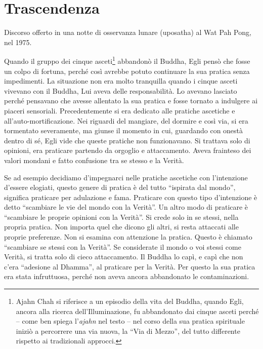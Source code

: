 \chapter{Trascendenza}

\begin{openingQuote}
  Discorso offerto in una notte di osservanza lunare (uposatha) al Wat
  Pah Pong, nel 1975.
\end{openingQuote}

Quando il gruppo dei cinque asceti\footnote{Ajahn Chah si riferisce a un
  episodio della vita del Buddha, quando Egli, ancora alla ricerca
  dell'Illuminazione, fu abbandonato dai cinque asceti perché -- come
  ben spiega l'\emph{ajahn} nel testo -- nel corso della sua pratica
  spirituale iniziò a percorrere una via nuova, la ``Via di Mezzo'', del
  tutto differente rispetto ai tradizionali approcci.} abbandonò il
Buddha, Egli pensò che fosse un colpo di fortuna, perché così avrebbe
potuto continuare la sua pratica senza impedimenti. La situazione non
era molto tranquilla quando i cinque asceti vivevano con il Buddha, Lui
aveva delle responsabilità. Lo avevano lasciato perché pensavano che
avesse allentato la sua pratica e fosse tornato a indulgere ai piaceri
sensoriali. Precedentemente si era dedicato alle pratiche ascetiche e
all'auto-mortificazione. Nei riguardi del mangiare, del dormire e così
via, si era tormentato severamente, ma giunse il momento in cui,
guardando con onestà dentro di sé, Egli vide che queste pratiche non
funzionavano. Si trattava solo di opinioni, era praticare partendo da
orgoglio e attaccamento. Aveva frainteso dei valori mondani e fatto
confusione tra se stesso e la Verità.

Se ad esempio decidiamo d'impegnarci nelle pratiche ascetiche con
l'intenzione d'essere elogiati, questo genere di pratica è del tutto
``ispirata dal mondo'', significa praticare per adulazione e fama.
Praticare con questo tipo d'intenzione è detto ``scambiare le vie del
mondo con la Verità''. Un altro modo di praticare è ``scambiare le
proprie opinioni con la Verità''. Si crede solo in se stessi, nella
propria pratica. Non importa quel che dicono gli altri, si resta
attaccati alle proprie preferenze. Non si esamina con attenzione la
pratica. Questo è chiamato ``scambiare se stessi con la Verità''. Se
considerate il mondo o voi stessi come Verità, si tratta solo di cieco
attaccamento. Il Buddha lo capì, e capì che non c'era ``adesione al
Dhamma'', al praticare per la Verità. Per questo la sua pratica era
stata infruttuosa, perché non aveva ancora abbandonato le
contaminazioni.


